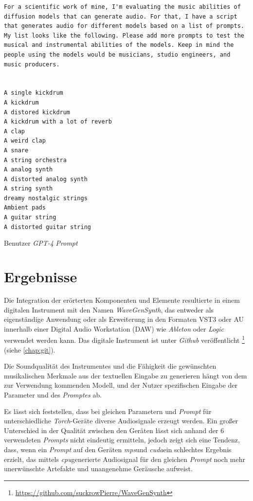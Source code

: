 \documentclass[
  a4paper,  %
  twoside,  %
  bibliography=totoc,
  headsepline,
  cleardoublepage=empty,
  parskip=half,
  draft=false
]{scrbook}
\begin{document}
\begin{Listing}
\begin{lstlisting}[style=gpt]
For a scientific work of mine, I'm evaluating the music abilities of diffusion models that can generate audio. For that, I have a script that generates audio for different models based on a list of prompts. My list looks like the following. Please add more prompts to test the musical and instrumental abilities of the models. Keep in mind the people using the models would be musicians, studio engineers, and music producers. 


A single kickdrum
A kickdrum
A distored kickdrum
A kickdrum with a lot of reverb
A clap
A weird clap
A snare
A string orchestra
A analog synth
A distorted analog synth
A string synth
dreamy nostalgic strings
Ambient pads
A guitar string
A distorted guitar string
\end{lstlisting}
    \caption{Benutzer \emph{GPT-4} \emph{Prompt}}
  \label{lst:prompt}
\end{Listing}

\chapter{Ergebnisse}
Die Integration der erörterten Komponenten und Elemente resultierte in einem digitalen Instrument mit den Namen \emph{WaveGenSynth}, das entweder als eigenständige Anwendung oder als Erweiterung in den Formaten VST3 oder AU innerhalb einer Digital Audio Workstation (DAW) wie \emph{Ableton} \cite{noauthor_ableton_nodate} oder \emph{Logic} \cite{noauthor_logic_nodate} verwendet werden kann. Das digitale Instrument ist unter \emph{Github} \cite{noauthor_github_nodate} veröffentlicht \footnote{\url{https://github.com/suckrowPierre/WaveGenSynth}} (siehe \ref{chap:git}). 

Die Soundqualität des Instrumentes und die Fähigkeit die gewünschten musikalischen Merkmale aus der textuellen Eingabe zu generieren hängt von dem zur Verwendung kommenden Modell, und der Nutzer spezifischen Eingabe der Parameter und des \emph{Promptes} ab. 

Es lässt sich feststellen, dass bei gleichen Parametern und \emph{Prompt} für unterschiedliche \emph{Torch}-Geräte diverse Audiosignale erzeugt werden. Ein großer Unterschied in der Qualität zwischen den Geräten lässt sich anhand der $6$ verwendeten \emph{Prompts} nicht eindeutig ermitteln, jedoch zeigt sich eine Tendenz, dass, wenn ein \emph{Prompt} auf den Geräten \glqq\emph{mps}\grqq und \glqq\emph{cuda}\grqq ein schlechtes Ergebnis erzielt, das mittels \glqq\emph{cpu}\grqq generierte Audiosignal für den gleichen \emph{Prompt} noch mehr unerwünschte Artefakte und unangenehme Geräusche aufweist.
\end{document}
